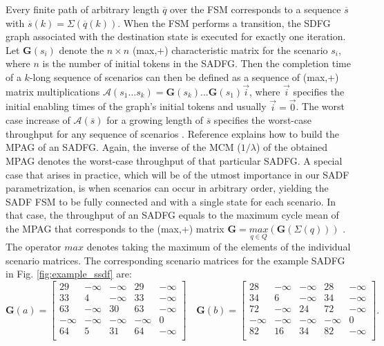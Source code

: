 \documentclass[]{eptcs}
\begin{document}
Every finite path of arbitrary length $\overline{q}$ over the FSM corresponds to a sequence $\overline{s}$ with $\overline{s}(k)=\Sigma(\overline{q}(k))$. When the FSM performs a transition, the SDFG graph associated with the destination state is executed for exactly one iteration. Let $\mathbf{G}(s_i)$ denote the $n \times n$ (max,+) characteristic matrix for the scenario $s_i$, where $n$ is the number of initial tokens in the SADFG. Then the completion time of a $k$-long sequence of scenarios can then be defined as a sequence of (max,+) matrix multiplications $\mathcal{A}(s_1 \ldots s_k)=\mathbf{G}(s_k)\ldots \mathbf{G}(s_1)\vec{i}$, where $\vec{i}$ specifies the initial enabling times of the graph's initial tokens and usually $\vec{i}=\vec{0}$. The worst case increase of $\mathcal{A}(\overline{s})$ for a growing length of $\overline{s}$ specifies the worst-case throughput for any sequence of scenarios \cite{2gaub} \cite{2geil:all}.
Reference \cite{2geil:all} explains how to build the MPAG of an SADFG. Again, the inverse of the MCM ($1/ \lambda$) of the obtained MPAG denotes the worst-case throughput of that particular SADFG. A special case that arises in practice, which will be of the utmost importance in our SADF parametrization, is when scenarios can occur in arbitrary order, yielding the SADF FSM to be fully connected and with a single state for each scenario. In that case, the throughput of an SADFG equals to the maximum cycle mean of the MPAG that corresponds to the (max,+) matrix $\mathbf{G} = \underset{q \in Q}{\mathit{max}} \left(\mathbf{G}(\Sigma(q)) \right)$ \cite{2geil:all}. The operator $\mathit{max}$ denotes taking the maximum of the elements of the individual scenario matrices. The corresponding scenario matrices for the example SADFG in Fig. \ref{fig:example_ssdf} are:
\[ \mathbf{G}(a) = \begin{bmatrix}
29 & -\infty & -\infty & 29 & -\infty \\
33 & 4 & -\infty & 33 & -\infty\\
63 & -\infty & 30 & 63 & -\infty\\
-\infty & -\infty & -\infty & -\infty & 0\\
64 & 5 & 31 & 64 & -\infty\\
\end{bmatrix}
\quad
\mathbf{G}(b) = \begin{bmatrix}
28 & -\infty & -\infty & 28 & -\infty \\
34 & 6 & -\infty & 34 & -\infty\\
72 & -\infty & 24 & 72 & -\infty\\
-\infty & -\infty & -\infty & -\infty & 0\\
82 & 16 & 34 & 82 & -\infty\\
\end{bmatrix}.\]
\end{document}

